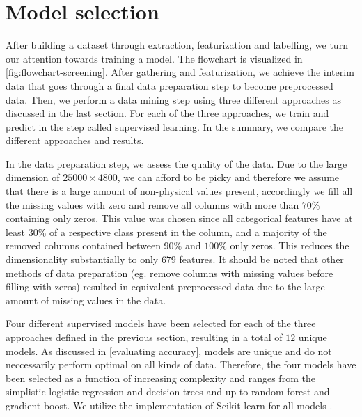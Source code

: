 \begin{comment}
\begin{figure}[t]{1\textwidth}
    \centering
    \texttt{[image: ../predicting-solid-state-qubit-candidates/reports/figures/buildingFeatures/histogram\_oxid\_nelements.pdf]}
    \caption{}
\end{figure}%
\end{comment}

\section{Model selection}

After building a dataset through extraction, featurization and labelling, we turn our attention towards training a model. The flowchart is visualized in \autoref{fig:flowchart-screening}. After gathering and featurization, we achieve the interim data that goes through a final data preparation step to become preprocessed data. Then, we perform a data mining step using three different approaches as discussed in the last section. For each of the three approaches, we train and predict in the step called supervised learning. In the summary, we compare the different approaches and results.

In the data preparation step, we assess the quality of the data. Due to the large dimension of $25000 \times 4800$, we can afford to be picky and therefore we assume that there is a large amount of non-physical values present, accordingly we fill all the missing values with zero and remove all columns with more than $70\%$ containing only zeros. This value was chosen since all categorical features have at least $30\%$ of a respective class present in the column, and a majority of the removed columns contained between $90\%$ and $100\%$ only zeros. This reduces the dimensionality substantially to only $679$ features. It should be noted that other methods of data preparation (eg. remove columns with missing values before filling with zeros) resulted in equivalent preprocessed data due to the large amount of missing values in the data.

Four different supervised models have been selected for each of the three approaches defined in the previous section, resulting in a total of $12$ unique models. As discussed in \autoref{evaluating accuracy}, models are unique and do not neccessarily perform optimal on all kinds of data. Therefore, the four models have been selected as a function of increasing complexity and ranges from the simplistic logistic regression and decision trees and up to random forest and gradient boost. We utilize the implementation of Scikit-learn for all models \cite{Pedregosa2012}.

